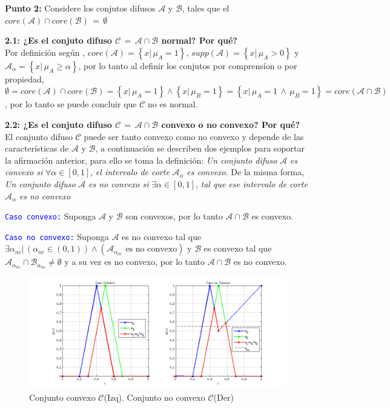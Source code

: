 \documentclass[10pt,onecolumn,twoside,letterpaper]{article}
\begin{document}
\par{\bf \large Punto 2:} Considere los conjutos difusos $\mathcal{A}$ y $\mathcal{B}$, tales que el $core(\mathcal{A})\cap core(\mathcal{B})\,=\,\emptyset$
\par{\bf 2.1: ¿Es el conjuto difuso $\mathcal{C}\,=\,\mathcal{A}\cap \mathcal{B}$ normal? Por qu\'e?}\\
Por definici\'on seg\'un \cite{Babuska1999}, $core(\mathcal{A})=\left\{x|\,\mu_A=1\right\}$, $supp(\mathcal{A})=\left\{x|\,\mu_A>0\right\}$ y $\mathcal{A}_{\alpha}=\left\{x|\,\mu_A\geq\alpha\right\}$, por lo tanto al definir los conjutos por comprens\'ion o por propiedad, $\emptyset=core(\mathcal{A})\cap core(\mathcal{B})=\left\{x|\,\mu_A=1\right\}\wedge\left\{x|\,\mu_B=1\right\}=\left\{x|\,\mu_A=1\,\wedge\,\mu_B=1\right\}=core(\mathcal{A}\cap\mathcal{B})$, por lo tanto se puede concluir que $\mathcal{C}$ no es normal.\\
\par{\bf 2.2: ¿Es el conjuto difuso $\mathcal{C}\,=\,\mathcal{A}\cap \mathcal{B}$ convexo o no convexo? Por qu\'e?}\\
El conjunto difuso $\mathcal{C}$ puede ser tanto convexo como no convexo y depende de las caracter\'isticas de $\mathcal{A}$ y $\mathcal{B}$, a continuaci\'on se describen dos ejemplos para soportar la afirmaci\'on anterior, para ello se toma la definici\'on: \emph{Un conjunto difuso} $\mathcal{A}$ \emph{es convexo si} $\forall \alpha\in[0,1]$, \emph{el intervalo de corte} $\mathcal{A}_\alpha$ \emph{es convexo}. De la misma forma, \emph{Un conjunto difuso} $\mathcal{A}$ \emph{es no convexo si} $\exists \alpha\in[0,1]$, \emph{tal que ese intervalo de corte} $\mathcal{A}_\alpha$ \emph{es no convexo}
\par \textcolor{blue}{\texttt{Caso convexo:}} Suponga $\mathcal{A}$ y $\mathcal{B}$ son convexos, por lo tanto $\mathcal{A}\cap\mathcal{B}$ es convexo.
\par \textcolor{blue}{\texttt{Caso no convexo:}} Suponga $\mathcal{A}$ es no convexo tal que $\exists{\alpha}_{nc}|\,(\alpha_{nc}\in(0,1))\wedge(\mathcal{A}_{\alpha_{nc}}\text{ es no convexo})$ y $\mathcal{B}$ es convexo tal que $\mathcal{A}_{\alpha_{nc}}\cap\mathcal{B}_{\alpha_{nc}}\neq\emptyset$ y a su vez es no convexo, por lo tanto $\mathcal{A}\cap\mathcal{B}$ es no convexo.
\begin{figure}[H]
 \centering
 \includegraphics[scale=0.6]{CnvxOrNotCnvx.png}
 \caption{Conjunto convexo $\mathcal{C}$(Izq). Conjunto no convexo $\mathcal{C}$(Der)}
 \label{fig:CnvxOrNotCnvx}
\end{figure}
\end{document}
